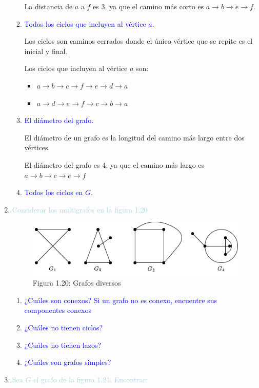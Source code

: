 \documentclass{article}
\newcommand{\lb}[1]{\textcolor{lightblue}{#1}}
\newcommand{\db}[1]{\textcolor{blue}{#1}}
\begin{document}
\begin{enumerate}[label=\color{red}\textbf{\arabic*)},leftmargin=*]
\begin{enumerate}[label=\color{red}\alph*)]
		La distancia de $a$ a $f$ es 3, ya que el camino más corto es $a\to b\to e\to f$.
		\item \db{Todos los ciclos que incluyen al vértice $a$.}
		
		Los ciclos son caminos cerrados donde el único vértice que se repite es el inicial y final.
		
		Los ciclos que incluyen al vértice $a$ son:
		\begin{itemize}[label=$-$]
			\item $a\to b\to c\to f\to e\to d\to a$
			\item $a\to d\to e\to f\to c\to b\to a$
		\end{itemize}
		
		\item \db{El diámetro del grafo.}
		
		El diámetro de un grafo es la longitud del camino más largo entre dos vértices.
		
		El diámetro del grafo es 4, ya que el camino más largo es $a\to b\to c\to e\to f$
		\item \db{Todos los ciclos en $G$.}
		
	\end{enumerate}
	\item \lb{Considerar los multigrafos en la figura 1.20}
	
	
\begin{figure}[h]
	\centering
	\includegraphics{"Imágenes/Grafos 1.20.drawio"}
	\caption*{Figura 1.20: Grafos diversos}
\end{figure}
	
	\begin{enumerate}[label=\color{red}\alph*)]
		\item \db{¿Cuáles son conexos? Si un grafo no es conexo, encuentre sus componentes conexos}
		\item \db{¿Cuáles no tienen ciclos?}
		\item \db{¿Cuáles no tienen lazos?}
		\item \db{¿Cuáles son grafos simples?}
	\end{enumerate}
	
	\item \lb{Sea $G$ el grafo de la figura 1.21. Encontrar:}
	

\end{enumerate}
\end{document}
